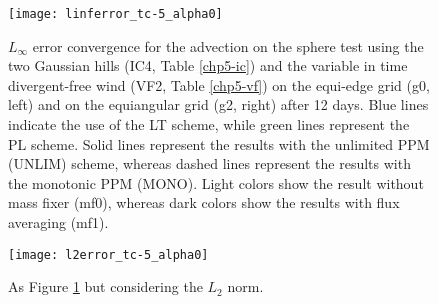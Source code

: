 \begin{figure}[!htb]
	\centering
	\texttt{[image: linferror\_tc-5\_alpha0]}
	\caption{
$L_{\infty}$ error convergence for the advection on the sphere test using the two Gaussian hills  (IC4, Table \ref{chp5-ic}) and the variable in time divergent-free wind
(VF2, Table \ref{chp5-vf}) on the equi-edge grid (g0, left) and on the equiangular grid (g2, right) after 12 days.
Blue lines indicate the use of the LT scheme, while green lines represent the PL scheme.
Solid lines represent the results with the unlimited PPM (UNLIM) scheme, whereas dashed lines represent the results with the monotonic PPM (MONO).
Light colors show the result without mass fixer (mf0), whereas dark colors show the results with flux averaging (mf1).
\label{chp-advcs-sec-exp-adv3-linf}}
\end{figure}

\begin{figure}[!htb]
	\centering
	\texttt{[image: l2error\_tc-5\_alpha0]}
	\caption{As Figure \ref{chp-advcs-sec-exp-adv3-linf} but considering the $L_2$ norm. \label{chp-advcs-sec-exp-adv3-l2}}
\end{figure}


\newpage
